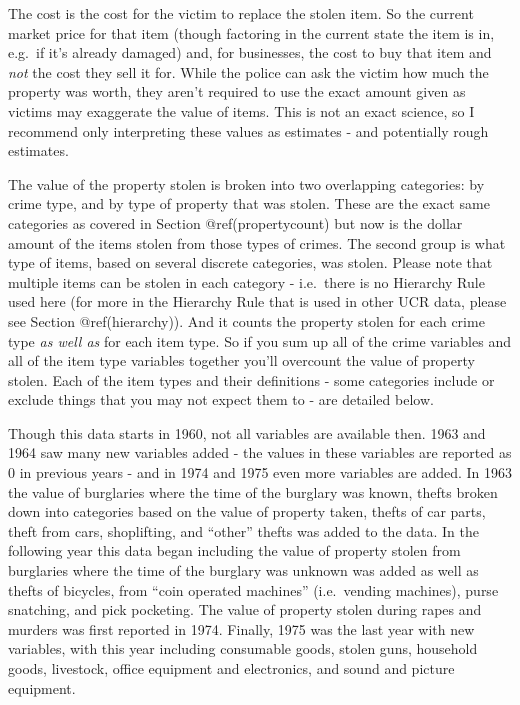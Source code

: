 \documentclass[
  12pt,
  openany]{book}
\begin{document}
The cost is the cost for the victim to replace the stolen item. So the current market price for that item (though factoring in the current state the item is in, e.g.~if it's already damaged) and, for businesses, the cost to buy that item and \emph{not} the cost they sell it for. While the police can ask the victim how much the property was worth, they aren't required to use the exact amount given as victims may exaggerate the value of items. This is not an exact science, so I recommend only interpreting these values as estimates - and potentially rough estimates.

The value of the property stolen is broken into two overlapping categories: by crime type, and by type of property that was stolen. These are the exact same categories as covered in Section @ref(propertycount) but now is the dollar amount of the items stolen from those types of crimes. The second group is what type of items, based on several discrete categories, was stolen. Please note that multiple items can be stolen in each category - i.e.~there is no Hierarchy Rule used here (for more in the Hierarchy Rule that is used in other UCR data, please see Section @ref(hierarchy)). And it counts the property stolen for each crime type \emph{as well as} for each item type. So if you sum up all of the crime variables and all of the item type variables together you'll overcount the value of property stolen. Each of the item types and their definitions - some categories include or exclude things that you may not expect them to - are detailed below.

Though this data starts in 1960, not all variables are available then. 1963 and 1964 saw many new variables added - the values in these variables are reported as 0 in previous years - and in 1974 and 1975 even more variables are added. In 1963 the value of burglaries where the time of the burglary was known, thefts broken down into categories based on the value of property taken, thefts of car parts, theft from cars, shoplifting, and ``other'' thefts was added to the data. In the following year this data began including the value of property stolen from burglaries where the time of the burglary was unknown was added as well as thefts of bicycles, from ``coin operated machines'' (i.e.~vending machines), purse snatching, and pick pocketing. The value of property stolen during rapes and murders was first reported in 1974. Finally, 1975 was the last year with new variables, with this year including consumable goods, stolen guns, household goods, livestock, office equipment and electronics, and sound and picture equipment.
\end{document}
